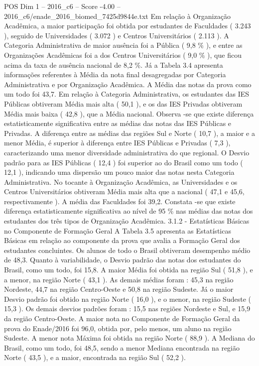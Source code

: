 \begin{textsample}{POS Dim 1 – 2016\_c6 – Score -4.00 – 2016\_c6/enade\_2016\_biomed\_7425d9844e.txt}
Em relação à Organização Acadêmica, a maior participação foi obtida por estudantes de Faculdades ( 3.243 ), seguido de Universidades ( 3.072 ) e Centros Universitários ( 2.113 ).
A Categoria Administrativa de maior ausência foi a Pública ( 9,8 \% ), e entre as Organizações Acadêmicas foi a dos Centros Universitários ( 9,0 \% ), que ficou acima da taxa de ausência nacional de 8,2 \%.
Já a Tabela 3.4 apresenta informações referentes à Média da nota final desagregadas por Categoria Administrativa e por Organização Acadêmica.
A Média das notas da prova como um todo foi 43,7.
Em relação à Categoria Administrativa, os estudantes das IES Públicas obtiveram Média mais alta ( 50,1 ), e os das IES Privadas obtiveram Média mais baixa ( 42,8 ), que a Média nacional.
Observa -se que existe diferença estatisticamente significativa entre as médias das notas das IES Públicas e Privadas.
A diferença entre as médias das regiões Sul e Norte ( 10,7 ), a maior e a menor Média, é superior à diferença entre IES Públicas e Privadas ( 7,3 ), caracterizando uma menor diversidade administrativa do que regional.
O Desvio padrão para as IES Públicas ( 12,4 ) foi superior ao do Brasil como um todo ( 12,1 ), indicando uma dispersão um pouco maior das notas nesta Categoria Administrativa.
No tocante à Organização Acadêmica, as Universidades e os Centros Universitários obtiveram Média mais alta que a nacional ( 47,1 e 45,6, respectivamente ).
A média das Faculdades foi 39,2.
Constata -se que existe diferença estatisticamente significativa ao nível de 95 \% nas médias das notas dos estudantes dos três tipos de Organização Acadêmica. 3.1.2 - Estatísticas Básicas no Componente de Formação Geral A Tabela 3.5 apresenta as Estatísticas Básicas em relação ao componente da prova que avalia a Formação Geral dos estudantes concluintes.
Os alunos de todo o Brasil obtiveram desempenho médio de 48,3.
Quanto à variabilidade, o Desvio padrão das notas dos estudantes do Brasil, como um todo, foi 15,8.
A maior Média foi obtida na região Sul ( 51,8 ), e a menor, na região Norte ( 43,1 ).
As demais médias foram : 45,3 na região Nordeste, 44,7 na região Centro-Oeste e 50,8 na região Sudeste.
Já o maior Desvio padrão foi obtido na região Norte ( 16,0 ), e o menor, na região Sudeste ( 15,3 ).
Os demais desvios padrões foram : 15,5 nas regiões Nordeste e Sul, e 15,9 da região Centro-Oeste.
A maior nota no Componente de Formação Geral da prova do Enade/2016 foi 96,0, obtida por, pelo menos, um aluno na região Sudeste.
A menor nota Máxima foi obtida na região Norte ( 88,9 ).
A Mediana do Brasil, como um todo, foi 48,5, sendo a menor Mediana encontrada na região Norte ( 43,5 ), e a maior, encontrada na região Sul ( 52,2 ).

\end{textsample}
